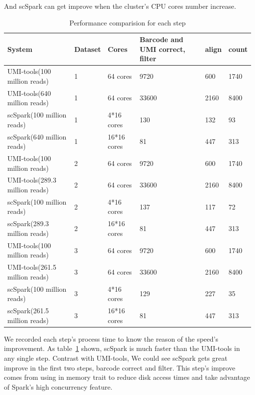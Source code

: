 \documentclass[conference]{IEEEtran}
\begin{document}
And scSpark can get improve when the cluster's CPU cores number increase.
\begin{table}
	\centering
	\caption{Performance comparision for each step}\label{tab2}
	\resizebox{0.45\textwidth}{!} {
	\begin{tabular}{l | l | l | l | l | l}
		\hline
		System & Dataset & Cores & Barcode and UMI correct, filter & align & count \\
		\hline
		UMI-tools(100 million reads) & 1 & 64 cores & 9720 & 600 & 1740 \\
		UMI-tools(640 million reads) & 1 & 64 cores & 33600 & 2160 & 8400 \\
		scSpark(100 million reads) & 1 & 4*16 cores & 130 & 132 & 93 \\
		scSpark(640 million reads) & 1 & 16*16 cores & 81 & 447 & 313 \\
		UMI-tools(100 million reads) & 2 & 64 cores & 9720 & 600 & 1740 \\
		UMI-tools(289.3 million reads) & 2 & 64 cores & 33600 & 2160 & 8400 \\
		scSpark(100 million reads) & 2 & 4*16 cores & 137 & 117 & 72 \\
		scSpark(289.3 million reads) & 2 & 16*16 cores & 81 & 447 & 313 \\
		UMI-tools(100 million reads) & 3 & 64 cores & 9720 & 600 & 1740 \\
		UMI-tools(261.5 million reads) & 3 & 64 cores & 33600 & 2160 & 8400 \\
		scSpark(100 million reads) & 3 & 4*16 cores & 129 & 227 & 35 \\
		scSpark(261.5 million reads) & 3 & 16*16 cores & 81 & 447 & 313 \\
		\hline
	\end{tabular} }
\end{table}
We recorded each step's process time to know the reason of the speed's improvement.
As table~\ref{tab2} shown, scSpark is much faster than the UMI-tools in any single step.
Contrast with UMI-tools, We could see scSpark gets great improve in the first two steps, barcode correct and filter.
This step's improve comes from using in memory trait to reduce disk access times and take advantage of Spark's high concurrency feature.
\end{document}
